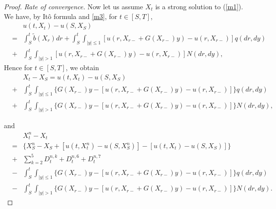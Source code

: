 \documentclass[11pt]{amsart}
\theoremstyle{plain}
\numberwithin{equation}{section}
\begin{document}
\begin{proof}
\emph{Rate of convergence. }Now let us assume $X_{t}$ is a strong solution
to (\ref{m1}). We have, by It\^{o} formula and \eqref{m3}, for $t\in \left[
S,T\right] $, 
\begin{eqnarray*}
&&u\left( t,X_{t}\right) -u\left( S,X_{S}\right) \\
&=&\int_{S}^{t}\tilde{b}\left( X_{r}\right) dr+\int_{S}^{t}\int_{\left\vert
y\right\vert \leq 1}\left[ u\left( r,X_{r-}+G\left( X_{r-}\right) y\right)
-u\left( r,X_{r-}\right) \right] q\left( dr,dy\right) \\
&+&\int_{S}^{t}\int_{\left\vert y\right\vert >1}\left[ u\left(
r,X_{r-}+G\left( X_{r-}\right) y\right) -u\left( r,X_{r-}\right) \right]
N\left( dr,dy\right) ,
\end{eqnarray*}Hence for $t\in \left[ S,T\right] $, we obtain 
\begin{eqnarray*}
&&X_{t}-X_{S}=u\left( t,X_{t}\right) -u\left( S,X_{S}\right) \\
&+&\int_{S}^{t}\int_{\left\vert y\right\vert \leq 1}\{G\left( X_{r-}\right)
y-\left[ u\left( r,X_{r-}+G\left( X_{r-}\right) y\right) -u\left(
r,X_{r-}\right) \right] \}q\left( dr,dy\right) \\
&+&\int_{S}^{t}\int_{\left\vert y\right\vert >1}\{G\left( X_{r-}\right) y- 
\left[ u\left( r,X_{r-}+G\left( X_{r-}\right) y\right) -u\left(
r,X_{r-}\right) \right] \}N\left( dr,dy\right) ,
\end{eqnarray*}

and 
\begin{eqnarray*}
&&X_{t}^{n}-X_{t} \\
&=&\{X_{S}^{n}-X_{S}+[u\left( t,X_{t}^{n}\right) -u\left( S,X_{S}^{n}\right)
]-[u\left( t,X_{t}\right) -u\left( S,X_{S}\right) ]\} \\
&+&\sum_{k=2}^{5}D_{t}^{n,k}+D_{t}^{n,6}+D_{t}^{n,7} \\
&-&\int_{S}^{t}\int_{\left\vert y\right\vert \leq 1}\{G\left( X_{r-}\right)
y-\left[ u\left( r,X_{r-}+G\left( X_{r-}\right) y\right) -u\left(
r,X_{r-}\right) \right] \}q\left( dr,dy\right) \\
&-&\int_{S}^{t}\int_{\left\vert y\right\vert >1}\{G\left( X_{r-}\right) y- 
\left[ u\left( r,X_{r-}+G\left( X_{r-}\right) y\right) -u\left(
r,X_{r-}\right) \right] \}N\left( dr,dy\right) .
\end{eqnarray*}


\end{proof}
\end{document}
